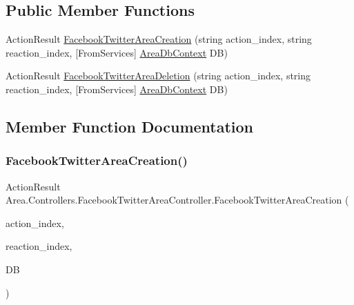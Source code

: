 \subsection*{Public Member Functions}
\begin{DoxyCompactItemize}
\item 
Action\+Result \mbox{\hyperlink{classArea_1_1Controllers_1_1FacebookTwitterAreaController_a8b6d2384b234eaaae0ea4e8b2d87e8ed}{Facebook\+Twitter\+Area\+Creation}} (string action\+\_\+index, string reaction\+\_\+index, \mbox{[}From\+Services\mbox{]} \mbox{\hyperlink{classArea_1_1DAT_1_1AreaDbContext}{Area\+Db\+Context}} DB)
\item 
Action\+Result \mbox{\hyperlink{classArea_1_1Controllers_1_1FacebookTwitterAreaController_aaecd5ed1abd81974a4a00b6addec9a09}{Facebook\+Twitter\+Area\+Deletion}} (string action\+\_\+index, string reaction\+\_\+index, \mbox{[}From\+Services\mbox{]} \mbox{\hyperlink{classArea_1_1DAT_1_1AreaDbContext}{Area\+Db\+Context}} DB)
\end{DoxyCompactItemize}


\subsection{Member Function Documentation}
\mbox{\label{classArea_1_1Controllers_1_1FacebookTwitterAreaController_a8b6d2384b234eaaae0ea4e8b2d87e8ed}} 
\subsubsection{\texorpdfstring{Facebook\+Twitter\+Area\+Creation()}{FacebookTwitterAreaCreation()}}
{\footnotesize\ttfamily Action\+Result Area.\+Controllers.\+Facebook\+Twitter\+Area\+Controller.\+Facebook\+Twitter\+Area\+Creation (\begin{DoxyParamCaption}\item[{string}]{action\+\_\+index,  }\item[{string}]{reaction\+\_\+index,  }\item[{\mbox{[}\+From\+Services\mbox{]} \mbox{\hyperlink{classArea_1_1DAT_1_1AreaDbContext}{Area\+Db\+Context}}}]{DB }\end{DoxyParamCaption})\hspace{0.3cm}{\ttfamily [inline]}}

